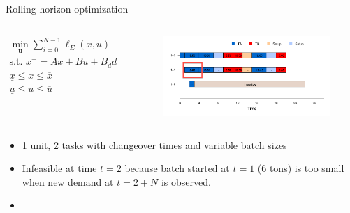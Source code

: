 \documentclass[table]{beamer}
\newcommand\bu {\mathbf{u}}
\begin{document}
\begin{frame}[t]{Rolling horizon optimization}
\begin{columns}[T]
{\tiny{
 \begin{gather*}
\min_{\bu} \sum_{i=0}^{N-1} \ell_E(x,u) \\
\text{s.t.~} x^+ = Ax + Bu + B_dd \\
\underline{x} \leq x \leq \overline{x} \\
\underline{u} \leq u \leq \overline{u}
\end{gather*}}}
\begin{figure}
   \includegraphics[scale=0.65]{gantt_NT.pdf}
  \end{figure}
\end{columns}
\begin{itemize} 
\item \alert{1 unit, 2 tasks with changeover times and variable batch sizes}
\item Infeasible at time $t=2$ because batch started at $t=1$ (6 tons) is too
  small when new demand at $t=2+N$ is observed.
\item {\color{blue}{Can terminal constraints be used?}}
\end{itemize}
\end{frame}
\end{document}

